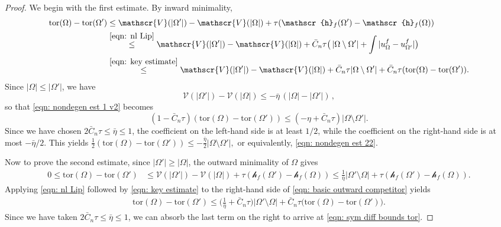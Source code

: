 \documentclass[10pt, reqno]{amsart}
\numberwithin{equation}{section}
\def\W{\Omega}
\def\tor{\mathrm{tor}}
\def\vpar{\eta}
\def\vo{\mathscr{V}}
\def\nl{\mathscr{h}_f}
\begin{document}
\begin{proof}
We begin with the first estimate. By inward minimality,
	 \begin{equation}
	 	\label{eqn: nondegen est 1 v2}
	 	\begin{split}
	 			\tor(\W) - \tor(\W') &   \leq   \vo(|\W'|)-\vo(|\W|) + \tau (\nl(\W') - \nl(\W)) \\
	 	& \overset{\eqref{eqn: nl Lip}}{\leq} \vo(|\W'|)-\vo(|\W|) +  \bar{C}_n\tau \big( \,|\W \setminus \W'| + \int |u_\W^f - u_{\W'}^f|\big) \\
	 	& \overset{\eqref{eqn: key estimate}}{\leq}   \vo(|\W'|)-\vo(|\W|) +  \bar{C}_n\tau  |\W\setminus \W'| +  \bar{C}_n\tau(\tor(\W) - \tor(\W')).
	 	\end{split}
	 \end{equation}
	 Since $|\W| \leq  |\W'|$, we have 
	 \[
	 \vo(|\W'|)-\vo(|\W|) \leq - \bar\eta  \,(|\W|-|\W'|)\,,
	 \]
     so that \eqref{eqn: nondegen est 1 v2} becomes
     \[
     (1-\bar{C}_n\tau)(\tor(\W) -\tor(\W')) \leq (-\eta + \bar{C}_n\tau)|\W \setminus \W'|.
     \]
Since we have chosen $2\bar{C}_n \tau\leq \bar\eta \leq 1$, the coefficient on the left-hand side is at least $1/2$, while the coefficient on the right-hand side is at most $-\bar\eta/2$.
This yields $\frac{1}{2}(\tor(\W) - \tor(\W') )\leq -\frac{\bar\eta}{2} |\W \setminus \W' |,$ or equivalently, \eqref{eqn: nondegen est 22}.

Now to prove the second estimate, since $|\W'| \geq |\W|$, the outward minimality of $\W$ gives
\begin{equation}\label{eqn: basic outward competitor}	
\begin{split}
0 \leq 	\tor(\W) - \tor(\W')& \leq \vo(|\W'|) - \vo(|\W|) + \tau(\nl(\W') - \nl(\W))\leq \frac{1}{\bar\eta}|\W'\setminus \W| + \tau(\nl(\W') - \nl(\W)).
\end{split}
\end{equation}
Applying \eqref{eqn: nl Lip} followed by \eqref{eqn: key estimate}  to the right-hand side of \eqref{eqn: basic outward competitor} yields
\begin{align*}
	\tor(\W) - \tor(\W') \leq \Big( \frac{1}{{\bar\vpar}} + \bar{C}_n \tau\Big) |\W'\setminus \W| +  \bar{C}_n \tau \big( \tor(\W) - \tor(\W')\big). 
\end{align*}
Since we have taken $2\bar{C}_n \tau \leq \bar\eta\leq  1$, we can absorb the last term on the right to arrive at \eqref{eqn: sym diff bounds tor}.
\end{proof}
\end{document}
